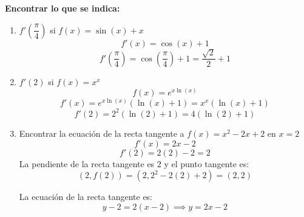 \documentclass[answers]{exam} %
\begin{document}
\begin{questions}
    \vspace{0.5cm}
    \newpage
    \question \large\textbf{Encontrar lo que se indica: }

    \begin{enumerate}[label=\alph*.]
        \item $\displaystyle f'\left(\dfrac{\pi}{4}\right)$ si $f(x)=\sin(x)+x$
              \[
                  f'(x) = \cos(x) + 1
              \]
              \[
                  f'\left(\dfrac{\pi}{4}\right) = \cos\left(\dfrac{\pi}{4}\right) + 1 = \dfrac{\sqrt{2}}{2} + 1
              \]

        \item $\displaystyle f'(2)$ si $f(x)=x^x$
              \[
                  f(x) = e^{x \ln(x)}
              \]
              \[
                  f'(x) = e^{x \ln(x)} \left( \ln(x) + 1 \right) = x^x \left( \ln(x) + 1 \right)
              \]
              \[
                  f'(2) = 2^2 \left( \ln(2) + 1 \right) = 4 \left( \ln(2) + 1 \right)
              \]

        \item Encontrar la ecuación de la recta tangente a $f(x)=x^2-2x+2$ en $x=2$
              \[
                  f'(x) = 2x - 2
              \]
              \[
                  f'(2) = 2(2) - 2 = 2
              \]
              La pendiente de la recta tangente es $2$ y el punto tangente es:
              \[
                  (2, f(2)) = (2, 2^2 - 2(2) + 2) = (2, 2)
              \]

              La ecuación de la recta tangente es:
              \[
                  y - 2 = 2(x - 2) \implies y = 2x - 2
              \]
    \end{enumerate}
    \vspace{0.5cm}
\end{questions}
\end{document}
